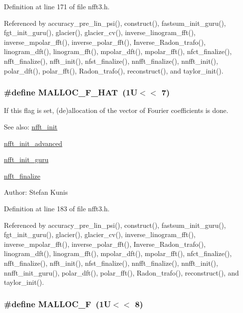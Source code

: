 Definition at line 171 of file nfft3.h.

Referenced by accuracy\_\-pre\_\-lin\_\-psi(), construct(), fastsum\_\-init\_\-guru(), fgt\_\-init\_\-guru(), glacier(), glacier\_\-cv(), inverse\_\-linogram\_\-fft(), inverse\_\-mpolar\_\-fft(), inverse\_\-polar\_\-fft(), Inverse\_\-Radon\_\-trafo(), linogram\_\-dft(), linogram\_\-fft(), mpolar\_\-dft(), mpolar\_\-fft(), nfct\_\-finalize(), nfft\_\-finalize(), nfft\_\-init(), nfst\_\-finalize(), nnfft\_\-finalize(), nnfft\_\-init(), polar\_\-dft(), polar\_\-fft(), Radon\_\-trafo(), reconstruct(), and taylor\_\-init().\hypertarget{group__nfft_ga23}{
\subsubsection[MALLOC\_\-F\_\-HAT]{\setlength{\rightskip}{0pt plus 5cm}\#define MALLOC\_\-F\_\-HAT~(1U$<$$<$ 7)}}
\label{group__nfft_ga23}


If this flag is set, (de)allocation of the vector of Fourier coefficients is done. 

\begin{Desc}
\item[See also:]\hyperlink{group__nfft_ga7}{nfft\_\-init} 

\hyperlink{group__nfft_ga8}{nfft\_\-init\_\-advanced} 

\hyperlink{group__nfft_ga9}{nfft\_\-init\_\-guru} 

\hyperlink{group__nfft_ga15}{nfft\_\-finalize} \end{Desc}
\begin{Desc}
\item[Author:]Stefan Kunis \end{Desc}


Definition at line 183 of file nfft3.h.

Referenced by accuracy\_\-pre\_\-lin\_\-psi(), construct(), fastsum\_\-init\_\-guru(), fgt\_\-init\_\-guru(), glacier(), glacier\_\-cv(), inverse\_\-linogram\_\-fft(), inverse\_\-mpolar\_\-fft(), inverse\_\-polar\_\-fft(), Inverse\_\-Radon\_\-trafo(), linogram\_\-dft(), linogram\_\-fft(), mpolar\_\-dft(), mpolar\_\-fft(), nfct\_\-finalize(), nfft\_\-finalize(), nfft\_\-init(), nfst\_\-finalize(), nnfft\_\-finalize(), nnfft\_\-init(), nnfft\_\-init\_\-guru(), polar\_\-dft(), polar\_\-fft(), Radon\_\-trafo(), reconstruct(), and taylor\_\-init().\hypertarget{group__nfft_ga24}{
\subsubsection[MALLOC\_\-F]{\setlength{\rightskip}{0pt plus 5cm}\#define MALLOC\_\-F~(1U$<$$<$ 8)}}
\label{group__nfft_ga24}



